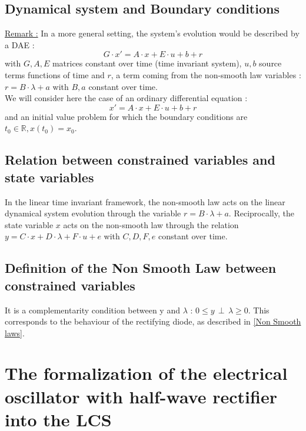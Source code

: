 \documentclass[10pt]{article}
\begin{document}
\subsection{Dynamical system and Boundary conditions}
\underline{Remark :}
In a more general setting, the system's evolution would be described by a DAE :
\[
G \cdot x' = A \cdot x + E \cdot u + b + r
\]
with $G , A , E$ matrices constant over time (time invariant system), $u , b$ source terms functions of time and $r$,
a term coming from the non-smooth law variables : $r = B \cdot \lambda + a$ with $B , a$ constant over time.\\
We will consider here the case of an ordinary differential equation :
\[
x' = A \cdot x + E \cdot u + b + r
\]
and an initial value problem for which the boundary conditions are $t_0 \in \mathbb{R} , x(t_0)= x_0$.

\subsection{Relation between constrained variables and state variables}
In the linear time invariant framework, the non-smooth law acts on the linear dynamical system evolution through the variable
$r = B \cdot \lambda + a$. Reciprocally, the state variable $x$ acts on the non-smooth law through the relation
$y = C \cdot x + D \cdot \lambda + F \cdot u + e$ with $C , D , F , e$ constant over time.

\subsection{Definition of the Non Smooth Law between constrained variables}
It is a complementarity condition between y and $\lambda$ : $0 \leq y \, \perp \, \lambda \geq 0$. This corresponds
to the behaviour of the rectifying diode, as described in \ref{Non Smooth laws}.

\section{The formalization of the electrical oscillator with half-wave rectifier into the LCS}
\end{document}
